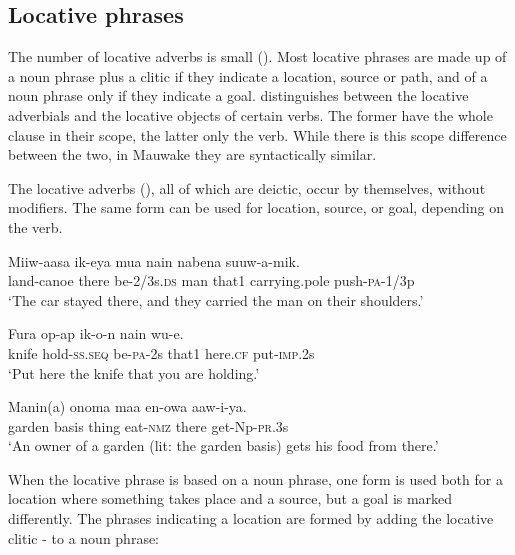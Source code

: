 \subsection{Locative phrases}
{}
The number of locative adverbs is small (). Most locative phrases are made up of a noun phrase plus a clitic if they indicate a location, source or path, and of a noun phrase only if they indicate a goal. \citet[78, 110--112]{Givon1984} distinguishes between the locative adverbials and the locative objects of certain verbs. The former have the whole clause in their scope, the latter only the verb. While there is this scope difference between the two, in Mauwake they are syntactically similar. 

The locative adverbs (), all of which are deictic, occur by themselves, without modifiers. The same form can be used for location, source, or goal, depending on the verb.

\ea%
\label{ex:x870}
\gll Miiw-aasa    ik-eya  mua  nain  nabena  suuw-a-mik. \\
   land-canoe  there  be-2/3s.\textsc{ds}  man  that1  carrying.pole  push-\textsc{pa}-1/3p   \\
\glt`The car stayed there, and they carried the man on their shoulders.'
\z





\ea%
\label{ex:x871}
\gll Fura  op-ap  ik-o-n  nain    wu-e. \\
    knife  hold-\textsc{ss}.\textsc{seq}  be-\textsc{pa}-2s  that1  here.\textsc{cf}  put-\textsc{imp}.2s  \\
\glt`Put here the knife that you are holding.'
\z





\ea%
\label{ex:x1833}
\gll Manin(a)  onoma  maa  en-owa    aaw-i-ya. \\
    garden  basis  thing  eat-\textsc{nmz}  there  get-Np-\textsc{pr}.3s  \\
\glt`An owner of a garden (lit: the garden basis) gets his food from there.'
\z





When the locative phrase is based on a noun phrase, one form is used both for  a location where something takes place and a source, but a goal is marked differently.  The phrases indicating a location are formed by adding the locative clitic \nobreakdash-  to a noun phrase:

